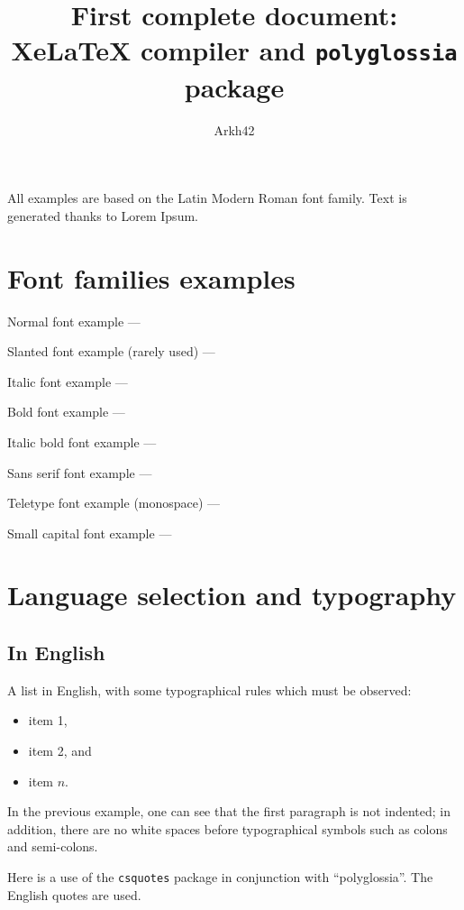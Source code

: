 \documentclass[11pt, a4paper, english]{article}
\author{Arkh42}
\title{First complete document: Xe\LaTeX{} compiler and \texttt{polyglossia} package}
\begin{document}
	
	
	\maketitle
	
	
	All examples are based on the Latin Modern Roman font family.
	Text is generated thanks to Lorem Ipsum.
	
	
	\section{Font families examples}
	
		Normal font example --- \lipsum[1]
		
		Slanted font example (rarely used) --- \textsl{\lipsum[1]}
		
		Italic font example --- \textit{\lipsum[1]}
		
		Bold font example --- \textbf{\lipsum[1]}
		
		Italic bold font example --- \textbf{\textit{\lipsum[1]}}
		
		Sans serif font example --- \textsf{\lipsum[1]}
		
		Teletype font example (monospace) --- \texttt{\lipsum[1]}
		
		Small capital font example --- \textsc{\lipsum[1]}
	
	
	\section{Language selection and typography}
	
	
		\subsection{In English}
		
		A list in English, with some typographical rules which must be observed:
		\begin{itemize}
			\item item 1,
			\item item 2, and
			\item item $n$.
		\end{itemize}
		
		In the previous example, one can see that the first paragraph is not indented; in addition, there are no white spaces before typographical symbols such as colons and semi-colons.
		
		Here is a use of the \texttt{csquotes} package in conjunction with \enquote{polyglossia}. The English quotes are used. 
	
\end{document}
